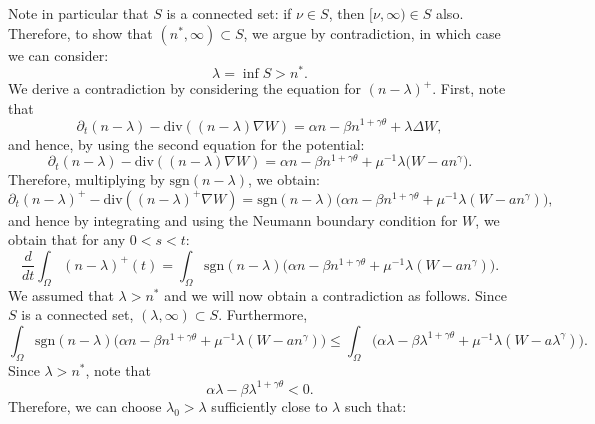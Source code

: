 \documentclass[12pt]{article}
\theoremstyle{plain}
\begin{document}
Note in particular that $S$ is a connected set: if $\nu \in S$, then $[\nu, \infty) \in S$ also. Therefore, to show that $(n^{*}, \infty) \subset S$, we argue by contradiction, in which case we can consider:
\begin{equation*}
\lambda = \inf S > n^{*}.
\end{equation*}
We derive a contradiction by considering the equation for $(n - \lambda)^{+}$. First, note that
\begin{equation*}
\partial_{t}(n - \lambda) - \text{div}((n - \lambda) \nabla W ) = \alpha n - \beta n^{1 + \gamma \theta} + \lambda \Delta W,
\end{equation*}
and hence, by using the second equation for the potential:
\begin{equation*}
\partial_{t}(n - \lambda) - \text{div}((n - \lambda) \nabla W) = \alpha n - \beta n^{1 + \gamma \theta} + \mu^{-1} \lambda \Big(W - a n^{\gamma}\Big).
\end{equation*}
Therefore, multiplying by $\text{sgn}(n - \lambda)$, we obtain:
\begin{equation*}
\partial_{t}(n - \lambda)^{+} - \text{div}((n - \lambda)^{+} \nabla W) = \text{sgn}(n - \lambda)\Big(\alpha n - \beta n^{1 + \gamma \theta} + \mu^{-1}\lambda(W - an^{\gamma})\Big),
\end{equation*}
and hence by integrating and using the Neumann boundary condition for $W$, we obtain that for any $0 < s < t$:
\begin{equation}\label{ddtabovelambda}
\frac{d}{dt} \int_{\Omega} (n - \lambda)^{+}(t) = \int_{\Omega} \text{sgn}(n - \lambda) \Big(\alpha n - \beta n^{1 + \gamma \theta} + \mu^{-1}\lambda(W - an^{\gamma})\Big).
\end{equation}
We assumed that $\lambda > n^{*}$ and we will now obtain a contradiction as follows. Since $S$ is a connected set, $(\lambda, \infty) \subset S$. Furthermore,
\begin{equation}\label{sgnineq}
\int_{\Omega} \text{sgn}(n - \lambda) \Big(\alpha n - \beta n^{1 + \gamma \theta} + \mu^{-1}\lambda (W - an^{\gamma})\Big) \le\int_{\Omega} \Big(\alpha\lambda - \beta \lambda^{1 + \gamma \theta} + \mu^{-1}\lambda(W - a\lambda^{\gamma})\Big).
\end{equation}
Since $\lambda > n^{*}$, note that 
\begin{equation*}
\alpha \lambda - \beta \lambda^{1 + \gamma \theta} < 0.
\end{equation*}
Therefore, we can choose $\lambda_{0} > \lambda$ sufficiently close to $\lambda$ such that:
\end{document}
